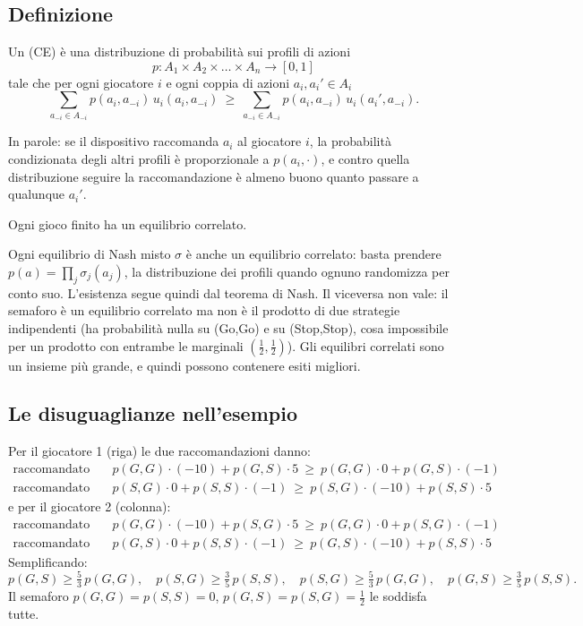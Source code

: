 \subsection{Definizione}

\begin{definizione}
Un  (CE) è una distribuzione di probabilità sui profili di azioni
\[
  p : A_1 \times A_2 \times \dots \times A_n \to [0,1]
\]
tale che per ogni giocatore $i$ e ogni coppia di azioni $a_i, a_i' \in A_i$
\[
  \sum_{a_{-i} \in A_{-i}} p(a_i, a_{-i})\, u_i(a_i, a_{-i})
  \ \ge\ \sum_{a_{-i} \in A_{-i}} p(a_i, a_{-i})\, u_i(a_i', a_{-i}).
\]
\end{definizione}
In parole: se il dispositivo raccomanda $a_i$ al giocatore $i$, la probabilità condizionata
degli altri profili è proporzionale a $p(a_i, \cdot)$, e contro quella distribuzione seguire
la raccomandazione è almeno buono quanto passare a qualunque $a_i'$.

\begin{teorema}[Esistenza]
Ogni gioco finito ha un equilibrio correlato.
\end{teorema}

\begin{extra}
Ogni equilibrio di Nash misto $\sigma$ è anche un equilibrio correlato: basta prendere
$p(a) = \prod_j \sigma_j(a_j)$, la distribuzione dei profili quando ognuno randomizza per
conto suo. L'esistenza segue quindi dal teorema di Nash. Il viceversa non vale: il semaforo
è un equilibrio correlato ma non è il prodotto di due strategie indipendenti (ha
probabilità nulla su (Go,Go) e su (Stop,Stop), cosa impossibile per un prodotto con
entrambe le marginali $(\tfrac12,\tfrac12)$). Gli equilibri correlati sono un insieme più
grande, e quindi possono contenere esiti migliori.
\end{extra}

\subsection{Le disuguaglianze nell'esempio}

Per il giocatore 1 (riga) le due raccomandazioni danno:
\begin{align*}
  \text{raccomandato Go:}\quad
  & p(G,G)\cdot(-10) + p(G,S)\cdot 5 \ \ge\ p(G,G)\cdot 0 + p(G,S)\cdot(-1)\\
  \text{raccomandato Stop:}\quad
  & p(S,G)\cdot 0 + p(S,S)\cdot(-1) \ \ge\ p(S,G)\cdot(-10) + p(S,S)\cdot 5
\end{align*}
e per il giocatore 2 (colonna):
\begin{align*}
  \text{raccomandato Go:}\quad
  & p(G,G)\cdot(-10) + p(S,G)\cdot 5 \ \ge\ p(G,G)\cdot 0 + p(S,G)\cdot(-1)\\
  \text{raccomandato Stop:}\quad
  & p(G,S)\cdot 0 + p(S,S)\cdot(-1) \ \ge\ p(G,S)\cdot(-10) + p(S,S)\cdot 5
\end{align*}
Semplificando:
\[
  p(G,S) \ge \tfrac53\,p(G,G), \quad
  p(S,G) \ge \tfrac35\,p(S,S), \quad
  p(S,G) \ge \tfrac53\,p(G,G), \quad
  p(G,S) \ge \tfrac35\,p(S,S).
\]
Il semaforo $p(G,G) = p(S,S) = 0$, $p(G,S) = p(S,G) = \tfrac12$ le soddisfa tutte.

